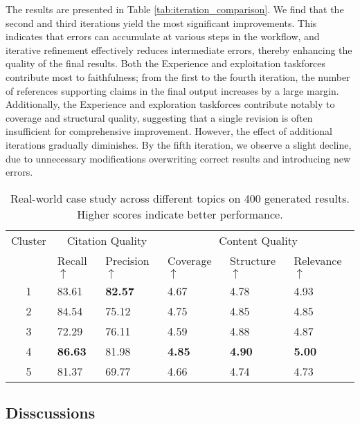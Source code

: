 \documentclass[manuscript,review,anonymous]{acmart}
\begin{document}
The results are presented in Table \ref{tab:iteration_comparison}. We find that the second and third iterations yield the most significant improvements. This indicates that errors can accumulate at various steps in the workflow, and iterative refinement effectively reduces intermediate errors, thereby enhancing the quality of the final results. Both the Experience and exploitation taskforces contribute most to faithfulness; from the first to the fourth iteration, the number of references supporting claims in the final output increases by a large margin. Additionally, the Experience and exploration taskforces contribute notably to coverage and structural quality, suggesting that a single revision is often insufficient for comprehensive improvement. However, the effect of additional iterations gradually diminishes. By the fifth iteration, we observe a slight decline, due to unnecessary modifications overwriting correct results and introducing new errors.

\begin{table}[]
    \centering
    \begin{adjustbox}{width=\columnwidth}
    \begin{tabular}{clllll}
    \toprule
    \multirow{2.5}{*}{Cluster} & \multicolumn{2}{c}{Citation Quality} & \multicolumn{3}{c}{Content Quality} \\
    \cmidrule(lr){2-3} \cmidrule(lr){4-6}
    & Recall $\uparrow$ & Precision $\uparrow$ & Coverage $\uparrow$ & Structure $\uparrow$ & Relevance $\uparrow$ \\
    \midrule
    1 & 83.61 & \textbf{82.57} & 4.67 & 4.78 & 4.93 \\
    2 & 84.54 & 75.12 & 4.75 & 4.85 & 4.85 \\
    3 & 72.29 & 76.11 & 4.59 & 4.88 & 4.87 \\
    4 & \textbf{86.63} & 81.98 & \textbf{4.85} & \textbf{4.90} & \textbf{5.00} \\
    5 & 81.37 & 69.77 & 4.66 & 4.74 & 4.73 \\
    \bottomrule
    \end{tabular}
    \end{adjustbox}
    \caption{Real-world case study across different topics on 400 generated results. Higher scores indicate better performance.}
    \label{tab:cluster_comparison}
\end{table}

\subsection{Disscussions}
\end{document}
